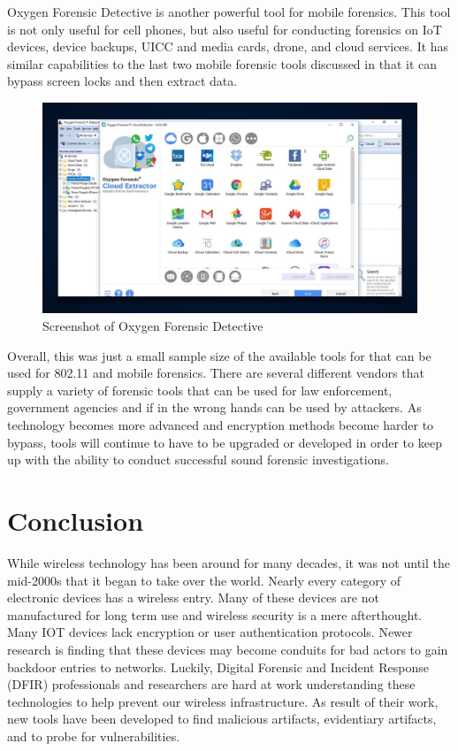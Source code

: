 \documentclass[acmlarge]{style/acmart}
\begin{document}
Oxygen Forensic Detective is another powerful tool for mobile forensics. This tool is not only useful for cell phones, but also useful for conducting forensics on IoT devices, device backups, UICC and media cards, drone, and cloud services. It has similar capabilities to the last two mobile forensic tools discussed in that it can bypass screen locks and then extract data. 

\begin{figure}[H]
  \centering
  \includegraphics[width=0.5\linewidth]{imgs/oxygen.jpg}
  \caption{Screenshot of Oxygen Forensic Detective}
  \label{fig:oxygen}
\end{figure}
 
Overall, this was just a small sample size of the available tools for that can be used for 802.11 and mobile forensics. There are several different vendors that supply a variety of forensic tools that can be used for law enforcement, government agencies and if in the wrong hands can be used by attackers. As technology becomes more advanced and encryption methods become harder to bypass, tools will continue to have to be upgraded or developed in order to keep up with the ability to conduct successful sound forensic investigations.


\section{Conclusion}

While wireless technology has been around for many decades, it was not until the mid-2000s that it began to take over the world. Nearly every category of electronic devices has a wireless entry. Many of these devices are not manufactured for long term use and wireless security is a mere afterthought. Many IOT devices lack encryption or user authentication protocols. Newer research is finding that these devices may become conduits for bad actors to gain backdoor entries to networks. Luckily, Digital Forensic and Incident Response (DFIR) professionals and researchers are hard at work understanding these technologies to help prevent our wireless infrastructure. As result of their work, new tools have been developed to find malicious artifacts, evidentiary artifacts, and to probe for vulnerabilities. 




\end{document}
